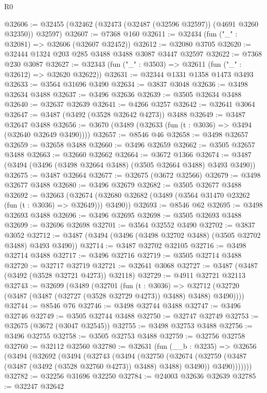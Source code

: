 \begin{lexlean}{R0}
\begin{coremodule}
@32606 := @32455 (@32462 (@32473 (@32487 (@32596 @32597)) (@4691 @3260 @32350)) @32597)
@32607 := @7368 @160
@32611 := @32434 (fun ("_" : @32081) => @32606 (@32607 @32452))
@32612 := @32080 @3705
@32620 := @32444 @1324 @203 @285 @3488 @3488 @3087 @3447 @32597
@32622 := @7368 @230 @3087
@32627 := @32343 (fun ("_" : @3503) => @32611 (fun ("_" : @32612) => @32620 @32622))
@32631 := @32344 @1331 @1358 @1473 @3493
@32633 := @3564 @31696 @3490
@32634 := @3837 @3048
@32636 := @3498 @32634 @3488
@32637 := @3496 @32636
@32639 := @3505 @32634 @3488
@32640 := @32637 @32639
@32641 := @4266 @3257
@32642 := @32641 @3064
@32647 := @3487 (@3492 (@3528 @32642 @4273)) @3488
@32649 := @3487 @32647 @3488
@32656 := @3670 (@3489 (@32633 (fun (t : @3036) => @3494 (@32640 @32649 @3490))))
@32657 := @8546 @46
@32658 := @3498 @32657
@32659 := @32658 @3488
@32660 := @3496 @32659
@32662 := @3505 @32657 @3488
@32663 := @32660 @32662
@32664 := @3672 @1366
@32674 := @3487 (@3494 (@3496 (@3498 @32664 @3488) (@3505 @32664 @3488) @3493 @3490))
@32675 := @3487 @32664
@32677 := @32675 (@3672 @32566)
@32679 := @3498 @32677 @3488
@32680 := @3496 @32679
@32682 := @3505 @32677 @3488
@32692 := @32663
    (@32674 (@32680 @32682 (@3489 (@3564 @31470 @23262 (fun (t : @3036) => @32649))) @3490))
@32693 := @8546 @62
@32695 := @3498 @32693 @3488
@32696 := @3496 @32695
@32698 := @3505 @32693 @3488
@32699 := @32696 @32698
@32701 := @3564 @32552 @3490
@32702 := @3837 @3052
@32712 := @3487 (@3494 (@3496 (@3498 @32702 @3488) (@3505 @32702 @3488) @3493 @3490))
@32714 := @3487 @32702 @32105
@32716 := @3498 @32714 @3488
@32717 := @3496 @32716
@32719 := @3505 @32714 @3488
@32720 := @32717 @32719
@32721 := @32641 @3068
@32727 := @3487 (@3487 (@3492 (@3528 @32721 @4273)) @32118)
@32729 := @4911 @32721 @32113
@32743 := @32699
    (@3489
      (@32701
        (fun (t : @3036) =>
        @32712 (@32720 (@3487 (@3487 (@32727 (@3528 @32729 @4273)) @3488) @3488) @3490))))
@32744 := @8546 @76
@32746 := @3498 @32744 @3488
@32747 := @3496 @32746
@32749 := @3505 @32744 @3488
@32750 := @32747 @32749
@32753 := @32675 (@3672 (@3047 @32545))
@32755 := @3498 @32753 @3488
@32756 := @3496 @32755
@32758 := @3505 @32753 @3488
@32759 := @32756 @32758
@32760 := @32112 @32560
@32780 := @32631
    (fun (__b : @3235) =>
    @32656
      (@3494
        (@32692
          (@3494
            (@32743
              (@3494
                (@32750
                  (@32674 (@32759 (@3487 (@3487 (@3492 (@3528 @32760 @4273)) @3488) @3488) @3490))
                  @3490)))))))
@32782 := @32256 @31696 @32250
@32784 := @24003 @32636 @32639
@32785 := @32247 @32642

\end{coremodule}
\end{lexlean}
